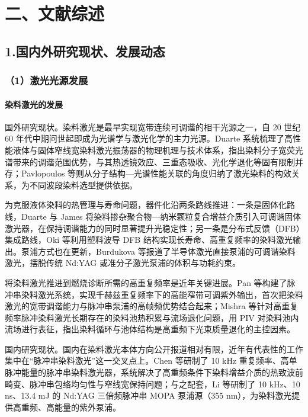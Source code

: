 
\chapter{二、文献综述}

\section{1.国内外研究现状、发展动态}

\subsection{（1）激光光源发展}

\subsubsection{染料激光的发展}

国外研究现状。染料激光是最早实现宽带连续可调谐的相干光源之一，自 20 世纪 60 年代中期问世起即成为光谱学与激光化学的主力光源。Duarte 系统梳理了高性能液体与固体窄线宽染料激光振荡器的物理机理与技术体系，指出染料分子宽荧光谱带来的调谐范围优势，与其热透镜效应、三重态吸收、光化学退化等固有限制并存\cite{ref1}；Pavlopoulos 等则从分子结构—光谱性能关联的角度归纳了激光染料的构效关系，为不同波段染料选型提供依据\cite{ref2}。

为克服液体染料的热管理与寿命问题，器件化沿两条路线推进：一条是固体化路线，Duarte 与 James 将染料掺杂聚合物—纳米颗粒复合增益介质引入可调谐固体激光器，在保持调谐能力的同时显著提升光稳定性\cite{ref3}；另一条是分布式反馈（DFB）集成路线，Oki 等利用塑料波导 DFB 结构实现长寿命、高重复频率的染料激光输出\cite{ref4}。泵浦方式也在更新，Burdukova 等报道了半导体激光直接泵浦的可调谐染料激光，摆脱传统 Nd:YAG 或准分子激光泵浦的体积与功耗约束\cite{ref5}。

将染料激光推进到燃烧诊断所需的高重复频率是近年关键进展。Pan 等构建了脉冲串染料激光系统，实现千赫兹重复频率下的高能窄带可调紫外输出，首次把染料激光的宽带调谐能力与脉冲串泵浦的高帧频优势结合起来\cite{ref6}；Mishra 等针对高重复频率脉冲染料激光长期存在的染料池热积累与流场退化问题，用 PIV 对染料池内流场进行表征，指出染料循环与池体结构是高重频下光束质量退化的主控因素\cite{ref7}。

国内研究现状。国内在染料激光本体方向公开报道相对有限，近年有代表性的工作集中在``脉冲串染料激光''这一交叉点上。Chen 等研制了 10 kHz 重复频率、高单脉冲能量的脉冲串染料激光器，系统解决了高重频条件下染料增益介质的热致波前畸变、脉冲串包络均匀性与窄线宽保持问题\cite{ref8}；与之配套，Li 等研制了 10 kHz、10 ns、13.4 mJ 的 Nd:YAG 三倍频脉冲串 MOPA 泵浦源（355 nm），为染料激光提供高重频、高能量的紫外泵浦\cite{ref9}。

